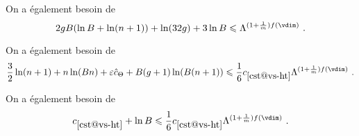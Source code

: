 On a également besoin de\todo[le prouver]
\begin{equation} \label{e:ht-Pv-adhoc}
  2 \genre B ( \ln B + \ln( \dimp + 1 ) ) + \ln(32\genre) + 3 \ln B
  \le
  \Lambda^{(1 + \frac1\puiss) f(\vdim)}
  \pmm.
\end{equation}

On a également besoin de\todo[le prouver]
\begin{equation} \label{e:ratfh1a-adhoc}
  \frac{3}2 \ln(\dimp+1)
  + \dimp \ln(B\dimp)
  + \expapx \htcmp
  + B (\genre + 1) \ln (B (\dimp+1))
  \le
  \frac16 \cst{vs-ht} \Lambda^{(1 + \frac1\puiss) f(\vdim)}
  \pmm.
\end{equation}

On a également besoin de\todo[le prouver]
\begin{equation} \label{e:extra-beta-adhoc}
  \cst{vs-ht} + \ln B
  \le
  \frac16 \cst{vs-ht} \Lambda^{(1 + \frac1\puiss) f(\vdim)}
  \pmm.
\end{equation}


\endinput

